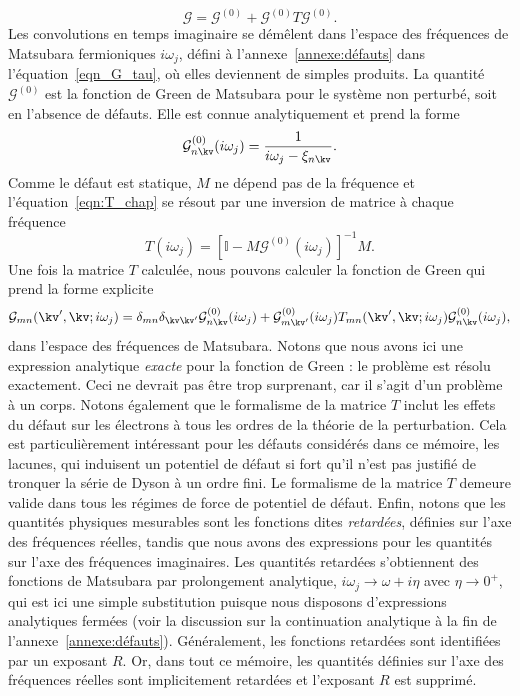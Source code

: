 \begin{equation}
    \mathcal{G} = \mathcal{G}^{(0)}+\mathcal{G}^{(0)}T\mathcal{G}^{(0)}.\label{eqn:G_chap}
\end{equation}
Les convolutions en temps imaginaire se démêlent dans l'espace des fréquences de Matsubara fermioniques $i\omega_j$, défini à l'annexe~\ref{annexe:défauts} dans l'équation~\eqref{eqn_G_tau}, où elles deviennent de simples produits. La quantité $\mathcal{G}^{(0)}$ est la fonction de Green de Matsubara pour le système non perturbé, soit en l'absence de défauts. Elle est connue analytiquement et prend la forme
\begin{equation}
    \mathcal{G}^{(0)}_{n\kv}(i\omega_j) = \frac{1}{i\omega_j-\xi_{n\kv}}.
\end{equation}
Comme le défaut est statique, $M$ ne dépend pas de la fréquence et l'équation~\eqref{eqn:T_chap} se résout par une inversion de matrice à chaque fréquence
\begin{equation}
    T(i\omega_j) = \left[\mathbb{I}-M\mathcal{G}^{(0)}(i\omega_j)\right]^{-1}M.
\end{equation}
Une fois la matrice $T$ calculée, nous pouvons calculer la fonction de Green qui prend la forme explicite
\begin{equation}
    \mathcal{G}_{mn}(\kv',\kv;i\omega_j) =\delta_{mn}\delta_{\kv\kv'}\mathcal{G}^{(0)}_{n\kv}(i\omega_j)+\mathcal{G}_{m\kv'}^{(0)}(i\omega_j)T_{mn}(\kv',\kv; i\omega_j)\mathcal{G}_{n\kv}^{(0)}(i\omega_j),
\end{equation}
dans l'espace des fréquences de Matsubara. Notons que nous avons ici une expression analytique \textit{exacte} pour la fonction de Green : le problème est résolu exactement. Ceci ne devrait pas être trop surprenant, car il s'agit d'un problème à un corps. Notons également que le formalisme de la matrice $T$ inclut les effets du défaut sur les électrons à tous les ordres de la théorie de la perturbation. Cela est particulièrement intéressant pour les défauts considérés dans ce mémoire, les lacunes, qui induisent un potentiel de défaut si fort qu'il n'est pas justifié de tronquer la série de Dyson à un ordre fini. Le formalisme de la matrice $T$ demeure valide dans tous les régimes de force de potentiel de défaut.
Enfin, notons que les quantités physiques mesurables sont les fonctions dites \textit{retardées}, définies
sur l'axe des fréquences réelles, tandis que nous avons des expressions pour les quantités sur l'axe des fréquences imaginaires. Les quantités retardées s'obtiennent des fonctions de Matsubara par prolongement analytique, $i\omega_j \to \omega + i\eta$ avec $\eta \to 0^+$, qui est ici une simple substitution puisque nous disposons d'expressions analytiques fermées (voir la discussion sur la continuation analytique à la fin de l'annexe~\ref{annexe:défauts}). Généralement, les fonctions retardées sont identifiées par un exposant $R$. Or, dans tout ce mémoire, les quantités définies sur l'axe des fréquences réelles sont implicitement retardées et l'exposant $R$ est supprimé.

